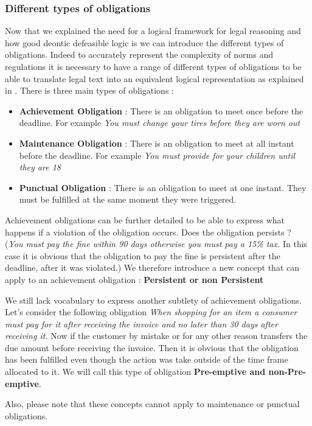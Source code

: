 \documentclass[10pt]{report}
\begin{document}
\subsubsection{Different types of obligations}
Now that we explained the need for a logical framework for legal reasoning and how good deontic defeasible logic is we can introduce the different types of obligations. Indeed to accurately represent the complexity of norms and regulations it is necessary to have a range of different types of obligations to be able to translate legal text into an equivalent logical representation as explained in \autocite{ConceptuallyRichModelofBPC}. There is three main types of obligations :
\begin{itemize}
\item \textbf{Achievement Obligation} : There is an obligation to meet once before the deadline. For example \textit{You must change your tires before they are worn out}
\item \textbf{Maintenance Obligation} : There is an obligation to meet at all instant before the deadline. For example \textit{You must provide for your children until they are 18}
\item \textbf{Punctual Obligation} : There is an obligation to meet at one instant. They must be fulfilled at the same moment they were triggered.
\end{itemize}

Achievement obligations can be further detailed to be able to express what happens if a violation of the obligation occurs. Does the obligation persists ? (\textit{You must pay the fine within 90 days otherwise you must pay a 15\% tax.} In this case it is obvious that the obligation to pay the fine is persistent after the deadline, after it was violated.) We therefore introduce a new concept that can apply to an achievement obligation : \textbf{Persistent or non Persistent}

We still lack vocabulary to express another subtlety of achievement obligations. Let's consider the following obligation \textit{When shopping for an item a consumer must pay for it after receiving the invoice and no later than 30 days after receiving it.} Now if the customer by mistake or for any other reason transfers the due amount before receiving the invoice. Then it is obvious that the obligation has been fulfilled even though the action was take outside of the time frame allocated to it. We will call this type of obligation \textbf{Pre-emptive and non-Pre-emptive}. 

Also, please note that these concepts cannot apply to maintenance or punctual obligations.
\end{document}

